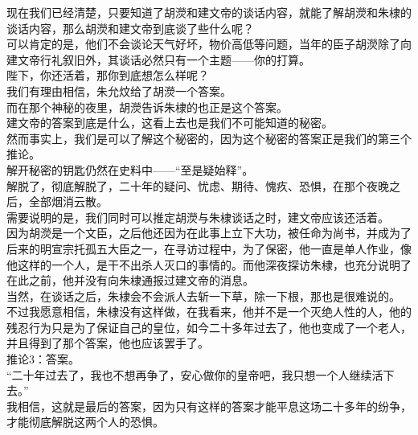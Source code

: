 \begin{multicols}{\theparacolNo}
现在我们已经清楚，只要知道了胡濙和建文帝的谈话内容，就能了解胡濙和朱棣的谈话内容，那么胡濙和建文帝到底谈了些什么呢？\\

可以肯定的是，他们不会谈论天气好坏，物价高低等问题，当年的臣子胡濙除了向建文帝行礼叙旧外，其谈话必然只有一个主题——你的打算。\\

陛下，你还活着，那你到底想怎么样呢？\\

我们有理由相信，朱允炆给了胡濙一个答案。\\

而在那个神秘的夜里，胡濙告诉朱棣的也正是这个答案。\\

建文帝的答案到底是什么，这看上去也是我们不可能知道的秘密。\\

然而事实上，我们是可以了解这个秘密的，因为这个秘密的答案正是我们的第三个推论。\\

解开秘密的钥匙仍然在史料中——“至是疑始释”。\\

解脱了，彻底解脱了，二十年的疑问、忧虑、期待、愧疚、恐惧，在那个夜晚之后，全部烟消云散。\\

需要说明的是，我们同时可以推定胡濙与朱棣谈话之时，建文帝应该还活着。\\

因为胡濙是一个文臣，之后他还因为在此事上立下大功，被任命为尚书，并成为了后来的明宣宗托孤五大臣之一，在寻访过程中，为了保密，他一直是单人作业，像他这样的一个人，是干不出杀人灭口的事情的。而他深夜探访朱棣，也充分说明了在此之前，他并没有向朱棣通报过建文帝的消息。\\

当然，在谈话之后，朱棣会不会派人去斩一下草，除一下根，那也是很难说的。\\

不过我愿意相信，朱棣没有这样做，在我看来，他并不是一个灭绝人性的人，他的残忍行为只是为了保证自己的皇位，如今二十多年过去了，他也变成了一个老人，并且得到了那个答案，他也应该罢手了。\\

推论3：答案。\\

“二十年过去了，我也不想再争了，安心做你的皇帝吧，我只想一个人继续活下去。”\\

我相信，这就是最后的答案，因为只有这样的答案才能平息这场二十多年的纷争，才能彻底解脱这两个人的恐惧。\\


\end{multicols}
